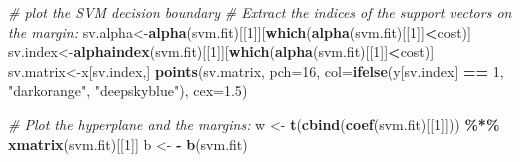 \documentclass[
]{book}
\newenvironment{Shaded}{\begin{snugshade}}{\end{snugshade}}
\newcommand{\AttributeTok}[1]{\textcolor[rgb]{0.13,0.29,0.53}{#1}}
\newcommand{\CommentTok}[1]{\textcolor[rgb]{0.56,0.35,0.01}{\textit{#1}}}
\newcommand{\DecValTok}[1]{\textcolor[rgb]{0.00,0.00,0.81}{#1}}
\newcommand{\FloatTok}[1]{\textcolor[rgb]{0.00,0.00,0.81}{#1}}
\newcommand{\FunctionTok}[1]{\textcolor[rgb]{0.13,0.29,0.53}{\textbf{#1}}}
\newcommand{\NormalTok}[1]{#1}
\newcommand{\OtherTok}[1]{\textcolor[rgb]{0.56,0.35,0.01}{#1}}
\newcommand{\SpecialCharTok}[1]{\textcolor[rgb]{0.81,0.36,0.00}{\textbf{#1}}}
\newcommand{\StringTok}[1]{\textcolor[rgb]{0.31,0.60,0.02}{#1}}
\theoremstyle{definition}
\theoremstyle{definition}
\theoremstyle{definition}
\theoremstyle{definition}
\theoremstyle{remark}
\begin{document}
\begin{Shaded}
\begin{Highlighting}[]
    \CommentTok{\# plot the SVM decision boundary}
    \CommentTok{\# Extract the indices of the support vectors on the margin:}
\NormalTok{    sv.alpha}\OtherTok{\textless{}{-}}\FunctionTok{alpha}\NormalTok{(svm.fit)[[}\DecValTok{1}\NormalTok{]][}\FunctionTok{which}\NormalTok{(}\FunctionTok{alpha}\NormalTok{(svm.fit)[[}\DecValTok{1}\NormalTok{]]}\SpecialCharTok{\textless{}}\NormalTok{cost)]}
\NormalTok{    sv.index}\OtherTok{\textless{}{-}}\FunctionTok{alphaindex}\NormalTok{(svm.fit)[[}\DecValTok{1}\NormalTok{]][}\FunctionTok{which}\NormalTok{(}\FunctionTok{alpha}\NormalTok{(svm.fit)[[}\DecValTok{1}\NormalTok{]]}\SpecialCharTok{\textless{}}\NormalTok{cost)]}
\NormalTok{    sv.matrix}\OtherTok{\textless{}{-}}\NormalTok{x[sv.index,]}
    \FunctionTok{points}\NormalTok{(sv.matrix, }\AttributeTok{pch=}\DecValTok{16}\NormalTok{, }\AttributeTok{col=}\FunctionTok{ifelse}\NormalTok{(y[sv.index] }\SpecialCharTok{==} \DecValTok{1}\NormalTok{, }\StringTok{"darkorange"}\NormalTok{, }\StringTok{"deepskyblue"}\NormalTok{), }\AttributeTok{cex=}\FloatTok{1.5}\NormalTok{)}

    \CommentTok{\# Plot the hyperplane and the margins:}
\NormalTok{    w }\OtherTok{\textless{}{-}} \FunctionTok{t}\NormalTok{(}\FunctionTok{cbind}\NormalTok{(}\FunctionTok{coef}\NormalTok{(svm.fit)[[}\DecValTok{1}\NormalTok{]])) }\SpecialCharTok{\%*\%} \FunctionTok{xmatrix}\NormalTok{(svm.fit)[[}\DecValTok{1}\NormalTok{]]}
\NormalTok{    b }\OtherTok{\textless{}{-}} \SpecialCharTok{{-}} \FunctionTok{b}\NormalTok{(svm.fit)}


\end{Highlighting}
\end{Shaded}
\end{document}
